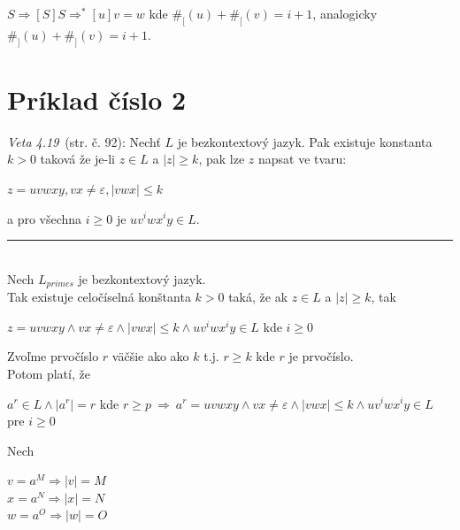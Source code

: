\documentclass[11pt,a4paper]{article}
\begin{document}
$S \Rightarrow [S]S \Rightarrow^{*} [u]v = w$ kde $\#_{[}(u) + \#_{[}(v) = i+1$, analogicky $\#_{]}(u) + \#_{]}(v) = i+1$.


\newpage
\section{Príklad číslo 2} %

\textit{Veta 4.19}~\cite{TIN}(str. č. 92): Nechť $L$ je bezkontextový jazyk. Pak existuje konstanta $k>0$ taková že je-li $z \in L$ a $|z| \geq k$, pak lze $z$ napsat ve tvaru:

\begin{center}
$z = uvwxy, vx \neq \varepsilon, |vwx| \leq k$
\end{center}

a pro všechna $i \geq 0$ je $uv^{i}wx^{i}y \in L$.

\rule{17cm}{0.4pt}

\hfill\\[-2em]

Nech $L_{primes}$ je bezkontextový jazyk.\\

Tak existuje celočíselná konštanta $k > 0$ taká, že ak $z \in L$ a $|z| \geq k$, tak

\begin{center}
$z = uvwxy \wedge vx \neq \varepsilon \wedge |vwx| \leq k \wedge uv^{i}wx^{i}y \in L$ kde $i \geq 0$\\
\end{center}

Zvoľme prvočíslo $r$ väčšie ako ako $k$ t.j. $r \geq k$ kde $r$ je prvočíslo.\\

Potom platí, že

\begin{center}
$a^{r} \in L \wedge |a^{r}| = r$ kde $r \geq p \ \Longrightarrow \ a^{r} = uvwxy \wedge vx \neq \varepsilon \wedge |vwx| \leq k \wedge uv^{i}wx^{i}y \in L$ pre $i \geq 0$\\
\end{center}

Nech
\begin{center}
$v = a^{M} \Rightarrow |v| = M$\\
$x = a^{N} \Rightarrow |x| = N$\\
$w = a^{O} \Rightarrow |w| = O$\\
\end{center}
\end{document}

